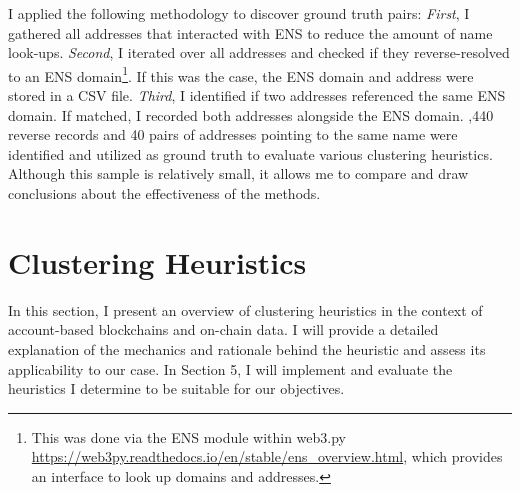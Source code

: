 \documentclass[12pt,a4paper,titlepage,oneside,english]{article}
\begin{document}
I applied the following methodology to discover ground truth pairs: \textit{First}, I gathered all addresses that interacted with ENS to reduce the amount of name look-ups. \textit{Second}, I iterated over all addresses and checked if they reverse-resolved to an ENS domain\footnote{This was done via the ENS module within web3.py \url{https://web3py.readthedocs.io/en/stable/ens_overview.html}, which provides an interface to look up domains and addresses.}. If this was the case, the ENS domain and address were stored in a CSV file. \textit{Third}, I identified if two addresses referenced the same ENS domain. If matched, I recorded both addresses alongside the ENS domain. ,440 reverse records and 40 pairs of addresses pointing to the same name were identified and utilized as ground truth to evaluate various clustering heuristics. Although this sample is relatively small, it allows me to compare and draw conclusions about the effectiveness of the methods.



\section{Clustering Heuristics}
In this section, I present an overview of clustering heuristics in the context of account-based blockchains and on-chain data. I will provide a detailed explanation of the mechanics and rationale behind the heuristic and assess its applicability to our case. 
In Section 5, I will implement and evaluate the heuristics I determine to be suitable for our objectives.
\end{document}
